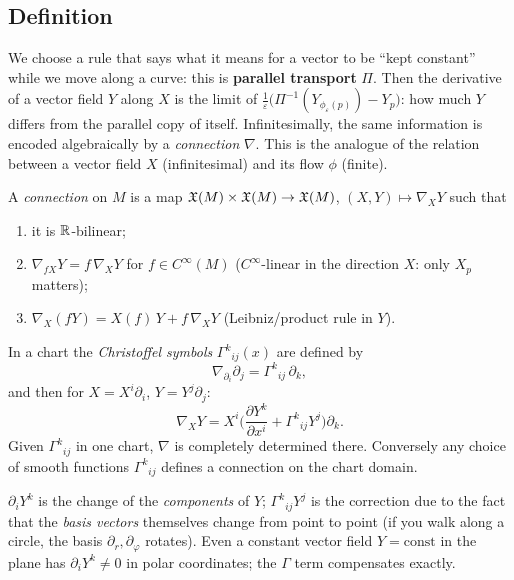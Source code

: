 \subsection{Definition}
\begin{intuition}[{derivative = ``compare with the parallel copy''}]
We choose a rule that says what it means for a vector to be ``kept constant'' while we move along a curve: this is \textbf{parallel transport} $\Pi$. Then the derivative of a vector field $Y$ along $X$ is the limit of $\frac1\varepsilon\big(\Pi^{-1}(Y_{\phi_\varepsilon(p)})-Y_p\big)$: how much $Y$ differs from the parallel copy of itself. Infinitesimally, the same information is encoded algebraically by a \emph{connection} $\nabla$. This is the analogue of the relation between a vector field $X$ (infinitesimal) and its flow $\phi$ (finite).
\end{intuition}
\begin{formal}
A \emph{connection} on $M$ is a map $\mathfrak{X}(M)\times\mathfrak{X}(M)\to\mathfrak{X}(M)$, $(X,Y)\mapsto\nabla_XY$ such that
\begin{enumerate}[label=(\roman*),nosep]
\item it is $\mathbb{R}$-bilinear;
\item $\nabla_{fX}Y=f\,\nabla_XY$ for $f\in C^\infty(M)$ ($C^\infty$-linear in the direction $X$: only $X_p$ matters);
\item $\nabla_X(fY)=X(f)\,Y+f\,\nabla_XY$ (Leibniz/product rule in $Y$).
\end{enumerate}
In a chart the \emph{Christoffel symbols} $\Gamma^k{}_{ij}(x)$ are defined by
\[
\nabla_{\partial_i}\partial_j=\Gamma^k{}_{ij}\,\partial_k ,
\]
and then for $X=X^i\partial_i$, $Y=Y^j\partial_j$:
\begin{equation}\label{eq:covdev}
\nabla_XY=X^i\Big(\frac{\partial Y^k}{\partial x^i}+\Gamma^k{}_{ij}Y^j\Big)\partial_k .
\end{equation}
Given $\Gamma^k{}_{ij}$ in one chart, $\nabla$ is completely determined there. Conversely any choice of smooth functions $\Gamma^k{}_{ij}$ defines a connection on the chart domain.
\end{formal}
\begin{intuition}[{Christoffel symbols = correction terms}]
$\partial_iY^k$ is the change of the \emph{components} of $Y$; $\Gamma^k{}_{ij}Y^j$ is the correction due to the fact that the \emph{basis vectors} themselves change from point to point (if you walk along a circle, the basis $\partial_r,\partial_\varphi$ rotates). Even a constant vector field $Y=\mathrm{const}$ in the plane has $\partial_iY^k\neq0$ in polar coordinates; the $\Gamma$ term compensates exactly.
\end{intuition}

